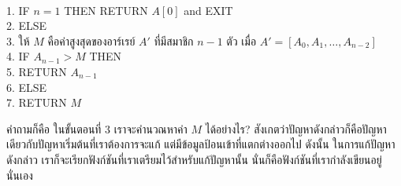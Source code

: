 \begin{algt}
\label{}
\\
1.\settowidth{\algbackindent}{1.}\hspace*{-\algbackindent}\hspace*{0.2in} IF $n=1$ THEN RETURN $A[0]$ and EXIT\\
2.\settowidth{\algbackindent}{2.}\hspace*{-\algbackindent}\hspace*{0.2in} ELSE\\
3.\settowidth{\algbackindent}{3.}\hspace*{-\algbackindent}\hspace*{0.2in}\hspace*{0.2in} ให้ $M$ คือ{\wbr}ค่าสูงสุด{\wbr}ของ{\wbr}อาร์เรย์ $A'$ ที่{\wbr}มี{\wbr}สมาชิก $n-1$ ตัว เมื่อ $A' = [A_0,A_1,\ldots,A_{n-2}]$\\
4.\settowidth{\algbackindent}{4.}\hspace*{-\algbackindent}\hspace*{0.2in}\hspace*{0.2in} IF $A_{n-1} > M$ THEN \\
5.\settowidth{\algbackindent}{5.}\hspace*{-\algbackindent}\hspace*{0.2in}\hspace*{0.2in}\hspace*{0.2in} RETURN $A_{n-1}$\\
6.\settowidth{\algbackindent}{6.}\hspace*{-\algbackindent}\hspace*{0.2in}\hspace*{0.2in} ELSE\\
7.\settowidth{\algbackindent}{7.}\hspace*{-\algbackindent}\hspace*{0.2in}\hspace*{0.2in}\hspace*{0.2in} RETURN $M$
\end{algt}

คำถาม{\wbr}ก็{\wbr}คือ ใน{\wbr}ขั้นตอน{\wbr}ที่ 3 เรา{\wbr}จะ{\wbr}คำนวณ{\wbr}หา{\wbr}ค่า $M$ ได้{\wbr}อย่างไร?
สังเกต{\wbr}ว่า{\wbr}ปัญหา{\wbr}ดังกล่าว{\wbr}ก็{\wbr}คือ{\wbr}ปัญหา{\wbr}เดียวกับ{\wbr}ปัญหา{\wbr}เริ่มต้น{\wbr}ที่{\wbr}เรา{\wbr}ต้องการ{\wbr}จะ{\wbr}แก้{\wbr}
แต่{\wbr}มี{\wbr}ข้อมูล{\wbr}ป้อน{\wbr}เข้าที่{\wbr}แตกต่าง{\wbr}ออก{\wbr}ไป ดังนั้น ใน{\wbr}การ{\wbr}แก้{\wbr}ปัญหา{\wbr}ดังกล่าว{\wbr}
เรา{\wbr}ก็{\wbr}จะ{\wbr}เรียก{\wbr}ฟังก์ชัน{\wbr}ที่{\wbr}เรา{\wbr}เตรียม{\wbr}ไว้{\wbr}สำหรับ{\wbr}แก้{\wbr}ปัญหา{\wbr}นั้น นั่น{\wbr}ก็{\wbr}คือ{\wbr}ฟังก์ชัน{\wbr}ที่{\wbr}เรา{\wbr}กำลัง{\wbr}เขียน{\wbr}อยู่{\wbr}นั่นเอง{\wbr}


